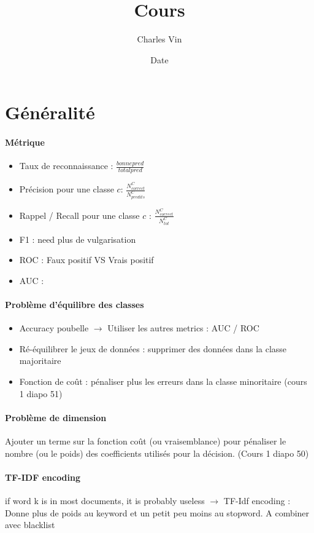 \documentclass{article}
\title{Cours}
\author{Charles Vin}
\date{Date}
\theoremstyle{plain}%
\theoremstyle{definition}
\theoremstyle{remark}
\begin{document}
\maketitle

\section{Généralité}
\paragraph*{Métrique}
\begin{itemize}
    \item Taux de reconnaissance : $ \frac{bonne pred}{total pred} $ 
    \item Précision pour une classe $ c $: $ \frac{N^C_{correct}}{N^C_{predits}} $ 
    \item Rappel / Recall pour une classe $ c $ : $ \frac{N^C_{correct}}{N^C_{tot}} $
    \item F1 : need plus de vulgarisation
    \item ROC : Faux positif VS Vrais positif
    \item AUC : 
\end{itemize}

\paragraph*{Problème d'équilibre des classes}
\begin{itemize}
    \item Accuracy poubelle $\rightarrow$ Utiliser les autres metrics : AUC / ROC
    \item Ré-équilibrer le jeux de données : supprimer des données dans la classe majoritaire 
    \item Fonction de coût : pénaliser plus les erreurs dans la classe minoritaire (cours 1 diapo 51)
\end{itemize}

\paragraph*{Problème de dimension}
Ajouter un terme sur la fonction coût (ou vraisemblance) pour pénaliser le nombre (ou le poids) des coefficients utilisés pour la décision. (Cours 1 diapo 50)

\paragraph*{TF-IDF encoding} if word k is in most documents, it is probably useless $\rightarrow$ TF-Idf encoding : Donne plus de poids au keyword et un petit peu moins au stopword. A combiner avec blacklist
\end{document}
